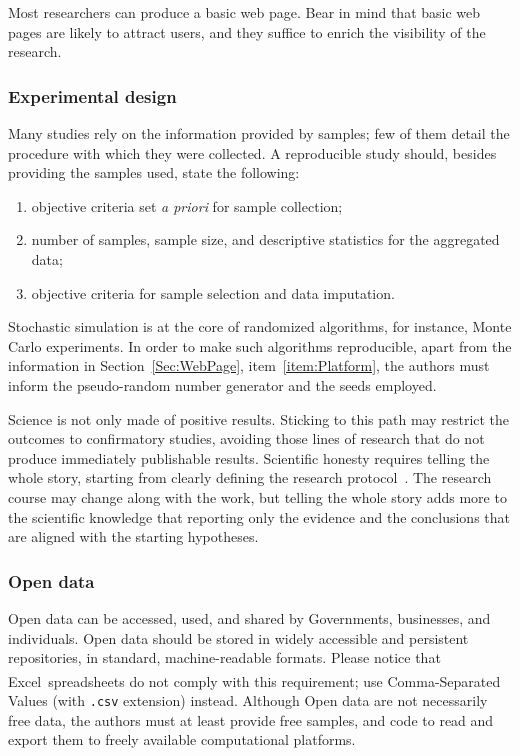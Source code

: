 \documentclass[journal,twoside]{IEEEtran}
\begin{document}
Most researchers can produce a basic web page. 
Bear in mind that basic web pages are likely to attract users, and they suffice to enrich the visibility of the research.

\subsubsection{Experimental design} Many studies rely on the information provided by samples;
few of them detail the procedure with which they were collected.
A reproducible study should, besides providing the samples used, state the following:
\begin{enumerate}
	\item objective criteria set \textit{a priori} for sample collection;
	\item number of samples, sample size, and descriptive statistics for the aggregated data;
	\item objective criteria for sample selection and data imputation.
\end{enumerate}

Stochastic simulation is at the core of randomized algorithms, for instance, Monte Carlo experiments.
In order to make such algorithms reproducible, apart from the information in Section~\ref{Sec:WebPage}, item~\ref{item:Platform}, the authors must inform the pseudo-random number generator and the seeds employed.

Science is not only made of positive results.
Sticking to this path may restrict the outcomes to confirmatory studies, avoiding those lines of research that do not produce immediately publishable results.
Scientific honesty requires telling the whole story, starting from clearly defining the research protocol~\cite{TellItlikeItIs}.
The research course may change along with the work, but telling the whole story adds more to the scientific knowledge that reporting only the evidence and the conclusions that are aligned with the starting hypotheses.


\subsubsection{Open data} Open data can be accessed, used, and shared by Governments, businesses, and individuals. 
Open data should be stored in widely accessible and persistent repositories, in standard, machine-readable formats.
Please notice that Excel\textsuperscript{\textcopyright}\ spreadsheets do not comply with this requirement; use Comma-Separated Values (with \verb|.csv| extension) instead.
Although Open data are not necessarily free data, the authors must at least provide free samples, and code to read and export them to freely available computational platforms.
\end{document}
